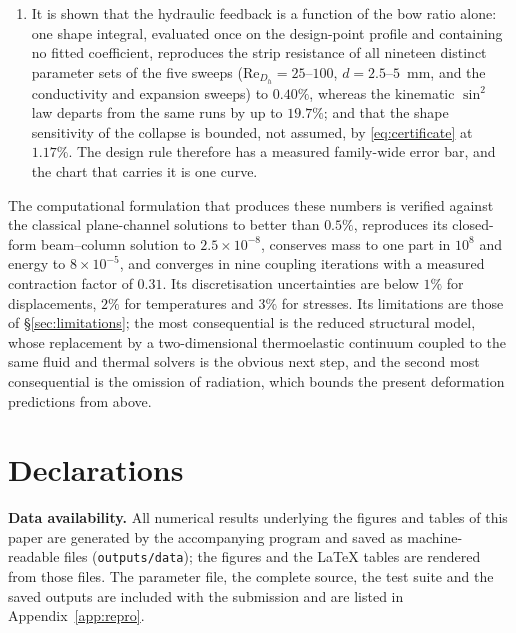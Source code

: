 \documentclass[11pt,a4paper]{article}
\newcommand{\ReDh}{\mathrm{Re}_{D_h}}
\begin{document}
\begin{enumerate}
and that the excess collapses onto $\bigl(H_0/H\bigr)^{0.79}$ with $R^2=0.81$, between the
two exponents $(\tfrac12,1)$ that bracket a layer thinned by acceleration and by wall shear.
\item It is shown that the hydraulic feedback is a function of the bow ratio alone: one shape
integral, evaluated once on the design-point profile and containing no fitted coefficient,
reproduces the strip resistance of all nineteen distinct parameter sets of the five sweeps
($\ReDh=25$--$100$, $d=2.5$--$5$~mm, and the conductivity and expansion sweeps) to $0.40\%$,
whereas the kinematic $\sin^2$ law departs from the same runs by up to $19.7\%$; and that the
shape sensitivity of the collapse is bounded, not assumed, by
\eqref{eq:certificate} at $1.17\%$. The design rule
therefore has a measured family-wide error bar, and the chart that carries it is one curve.
\end{enumerate}

The computational formulation that produces these numbers is verified against
the classical plane-channel solutions to better than $0.5\%$, reproduces its
closed-form beam--column solution to $2.5\times10^{-8}$, conserves mass to one
part in $10^{8}$ and energy to $8\times10^{-5}$, and converges in nine
coupling iterations with a measured contraction factor of $0.31$. Its
discretisation uncertainties are below $1\%$ for displacements, $2\%$ for
temperatures and $3\%$ for stresses. Its limitations are those of
\S\ref{sec:limitations}; the most consequential is the reduced structural
model, whose replacement by a two-dimensional thermoelastic continuum coupled
to the same fluid and thermal solvers is the obvious next step, and the second
most consequential is the omission of radiation, which bounds the present
deformation predictions from above.


\section*{Declarations}

\noindent\textbf{Data availability.}
All numerical results underlying the figures and tables of this paper are
generated by the accompanying program and saved as machine-readable files
(\texttt{outputs/data}); the figures and the \LaTeX{} tables are rendered from
those files. The parameter file, the complete source, the test suite and the
saved outputs are included with the submission and are listed in
Appendix~\ref{app:repro}.
\end{document}
